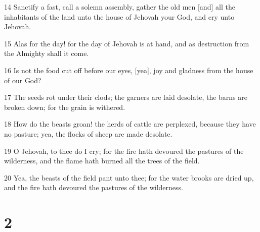 \par 14 Sanctify a fast, call a solemn assembly, gather the old men [and] all the inhabitants of the land unto the house of Jehovah your God, and cry unto Jehovah.
\par 15 Alas for the day! for the day of Jehovah is at hand, and as destruction from the Almighty shall it come.
\par 16 Is not the food cut off before our eyes, [yea], joy and gladness from the house of our God?
\par 17 The seeds rot under their clods; the garners are laid desolate, the barns are broken down; for the grain is withered.
\par 18 How do the beasts groan! the herds of cattle are perplexed, because they have no pasture; yea, the flocks of sheep are made desolate.
\par 19 O Jehovah, to thee do I cry; for the fire hath devoured the pastures of the wilderness, and the flame hath burned all the trees of the field.
\par 20 Yea, the beasts of the field pant unto thee; for the water brooks are dried up, and the fire hath devoured the pastures of the wilderness.

\chapter{2}

